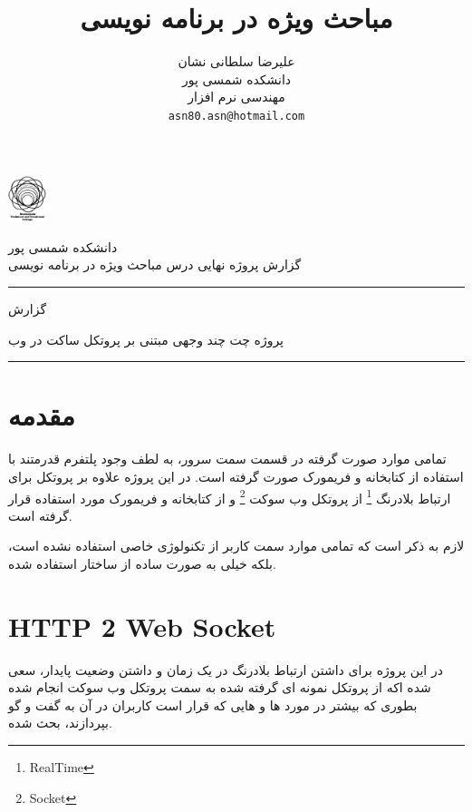 \documentclass{article}
\title{مباحث ویژه در برنامه نویسی}
\author{%
  علیرضا سلطانی نشان\\
  دانشکده شمسی پور\\
  مهندسی نرم افزار\\
  \texttt{asn80.asn@hotmail.com}
}
\begin{document}
\maketitle
\tableofcontents

\newpage

\begin{minipage}{0.1\textwidth}%
  \includegraphics[width=1.1cm]{tvu.png}
  \end{minipage}%
  \hfill%
  \begin{minipage}{0.9\textwidth}\raggedleft
  دانشکده شمسی پور\\
  گزارش پروژه نهایی درس مباحث ویژه در برنامه نویسی\\
  \end{minipage}

\par\noindent\rule{\textwidth}{3pt}
{\par\centering\large گزارش \par}
{\par\centering\large پروژه چت چند وجهی مبتنی بر پروتکل ساکت در وب  \par}
\par\noindent\rule{\textwidth}{1pt}

\section{مقدمه}

  تمامی موارد صورت گرفته در قسمت سمت سرور، به لطف وجود پلتفرم قدرمتند    
با استفاده از کتابخانه و فریمورک
صورت گرفته است.
در این پروژه علاوه بر پروتکل 
برای ارتباط بلادرنگ
\footnote{RealTime}
از پروتکل وب سوکت
\footnote{Socket}
و از کتابخانه و فریمورک 
مورد استفاده قرار گرفته است.

لازم به ذکر است که تمامی موارد سمت کاربر از تکنولوژی خاصی استفاده نشده است، بلکه
خیلی به صورت ساده از ساختار
استفاده شده.



\section{HTTP 2 Web Socket}
در این پروژه برای داشتن ارتباط بلادرنگ در یک زمان
و داشتن وضعیت پایدار، سعی شده اکه از پروتکل
نمونه ای گرفته شده به سمت پروتکل وب سوکت انجام شده بطوری که 
بیشتر در مورد 
 ها
و 
هایی که قرار است کاربران در آن به گفت و گو بپردازند، بحث شده.
\end{document}
